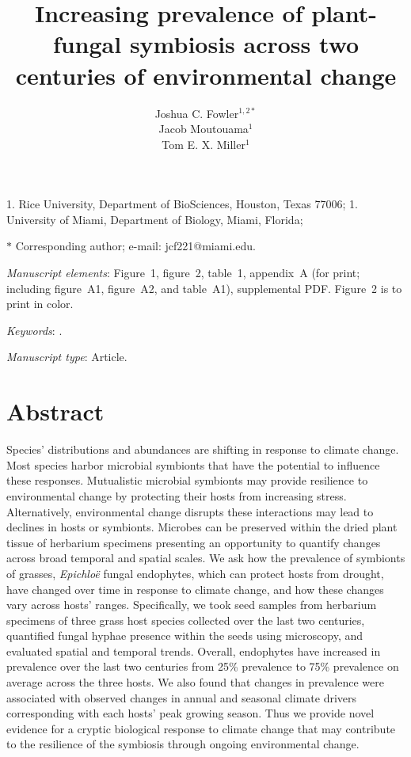 \documentclass[11pt]{article}
\title{Increasing prevalence of plant-fungal symbiosis across two centuries of environmental change}
\author{Joshua C. Fowler$^{1,2\ast}$ \\
	Jacob Moutouama$^{1}$\\
	Tom E. X. Miller$^{1}$}
\date{}
\begin{document}
	
	\maketitle
	
	\noindent{} 1. Rice University, Department of BioSciences, Houston, Texas 77006;
	\noindent{} 1. University of Miami, Department of Biology, Miami, Florida;


	\noindent{} $\ast$ Corresponding author; e-mail: jcf221@miami.edu.
	
	\bigskip
	
	\textit{Manuscript elements}: Figure~1, figure~2, table~1, appendix~A (for print; including figure~A1, figure~A2, and table~A1), supplemental PDF. Figure~2 is to print in color.
	
	\bigskip
	
	\textit{Keywords}: .
	
	\bigskip
	
	\textit{Manuscript type}: Article. %
	
	\bigskip
	
	
	
	\newpage{}
	
	\section*{Abstract}
Species' distributions and abundances are shifting in response to climate change. 
Most species harbor microbial symbionts that have the potential to influence these responses.
Mutualistic microbial symbionts may provide resilience to environmental change by protecting their hosts from increasing stress. Alternatively, environmental change disrupts these interactions may lead to declines in hosts or symbionts. 
Microbes can be preserved within the dried plant tissue of herbarium specimens presenting an opportunity to quantify changes across broad temporal and spatial scales. 
We ask how the prevalence of symbionts of grasses, \emph{Epichloë} fungal endophytes, which can protect hosts from drought, have changed over time in response to climate change, and how these changes vary across hosts' ranges.
Specifically, we took seed samples from herbarium specimens of three grass host species collected over the last two centuries, quantified fungal hyphae presence within the seeds using microscopy, and evaluated spatial and temporal trends. 
Overall, endophytes have increased in prevalence over the last two centuries from 25\% prevalence to 75\% prevalence on average across the three hosts.
We also found that changes in prevalence were associated with observed changes in annual and seasonal climate drivers corresponding with each hosts' peak growing season. 
Thus we provide novel evidence for a cryptic biological response to climate change that may contribute to the resilience of the symbiosis through ongoing environmental change.
	
\end{document}
